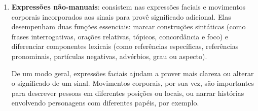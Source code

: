 \begin{enumerate}



    \item \textbf{Expressões não-manuais}: consistem nas expressões faciais e movimentos corporais incorporados aos sinais para provê significado adicional. Elas desempenham duas funções essenciais: marcar construções sintáticas (como frases interrogativas, orações relativas, tópicos, concordância e foco) e diferenciar componentes lexicais (como referências específicas, referências pronominais, partículas negativas, advérbios, grau ou aspecto).
    
    De um modo geral, expressões faciais ajudam a prover mais clareza ou alterar o significado de um sinal. 
    Movimentos corporais, por sua vez, são importantes para descrever pessoas em diferentes posições ou locais, ou narrar histórias envolvendo personagens com diferentes papéis, por exemplo.
 

    




\end{enumerate}
